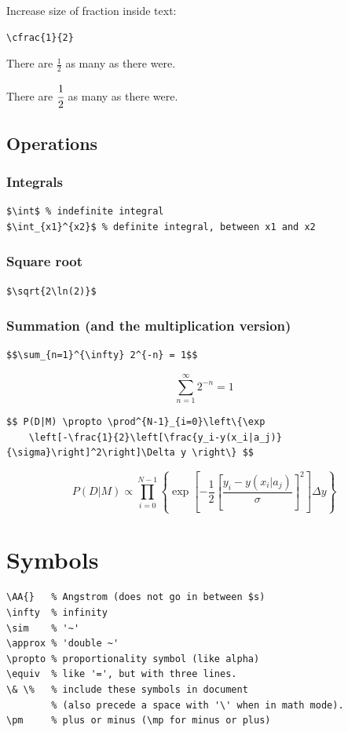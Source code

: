 \documentclass{article}
\begin{document}
Increase size of fraction inside text:
\begin{verbatim}
\cfrac{1}{2}
\end{verbatim}

There are $\frac{1}{2}$ as many as there were.\par
There are $\cfrac{1}{2}$ as many as there were.


\subsection{Operations}
\subsubsection{Integrals}
\begin{verbatim}
$\int$ % indefinite integral
$\int_{x1}^{x2}$ % definite integral, between x1 and x2
\end{verbatim}
\subsubsection{Square root}
\begin{verbatim}
$\sqrt{2\ln(2)}$
\end{verbatim}
\subsubsection{Summation (and the multiplication version)}
\begin{verbatim}
$$\sum_{n=1}^{\infty} 2^{-n} = 1$$
\end{verbatim}
$$\sum_{n=1}^{\infty} 2^{-n} = 1$$

\begin{verbatim}
$$ P(D|M) \propto \prod^{N-1}_{i=0}\left\{\exp
    \left[-\frac{1}{2}\left[\frac{y_i-y(x_i|a_j)}
{\sigma}\right]^2\right]\Delta y \right\} $$
\end{verbatim}
$$ P(D|M) \propto \prod^{N-1}_{i=0}\left\{\exp
    \left[-\frac{1}{2}\left[\frac{y_i-y(x_i|a_j)}
{\sigma}\right]^2\right]\Delta y \right\} $$


\newpage
\section{Symbols}
\begin{verbatim}
\AA{}   % Angstrom (does not go in between $s)
\infty  % infinity
\sim    % '~'
\approx % 'double ~'
\propto % proportionality symbol (like alpha)
\equiv  % like '=', but with three lines.
\& \%   % include these symbols in document
        % (also precede a space with '\' when in math mode).
\pm     % plus or minus (\mp for minus or plus)
\end{verbatim}
\end{document}
